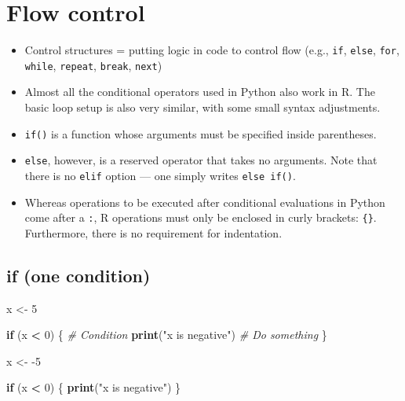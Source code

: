 \documentclass[
]{book}
\newenvironment{Shaded}{\begin{snugshade}}{\end{snugshade}}
\newcommand{\CommentTok}[1]{\textcolor[rgb]{0.56,0.35,0.01}{\textit{#1}}}
\newcommand{\ControlFlowTok}[1]{\textcolor[rgb]{0.13,0.29,0.53}{\textbf{#1}}}
\newcommand{\DecValTok}[1]{\textcolor[rgb]{0.00,0.00,0.81}{#1}}
\newcommand{\KeywordTok}[1]{\textcolor[rgb]{0.13,0.29,0.53}{\textbf{#1}}}
\newcommand{\NormalTok}[1]{#1}
\newcommand{\OperatorTok}[1]{\textcolor[rgb]{0.81,0.36,0.00}{\textbf{#1}}}
\newcommand{\StringTok}[1]{\textcolor[rgb]{0.31,0.60,0.02}{#1}}
\begin{document}
\hypertarget{flow}{%
\section{Flow control}\label{flow}}

\begin{itemize}
\item
  Control structures = putting logic in code to control flow (e.g., \texttt{if}, \texttt{else}, \texttt{for}, \texttt{while}, \texttt{repeat}, \texttt{break}, \texttt{next})
\item
  Almost all the conditional operators used in Python also work in R. The basic loop setup is also very similar, with some small syntax adjustments.
\item
  \texttt{if()} is a function whose arguments must be specified inside parentheses.
\item
  \texttt{else}, however, is a reserved operator that takes no arguments. Note that there is no \texttt{elif} option --- one simply writes \texttt{else\ if()}.
\item
  Whereas operations to be executed after conditional evaluations in Python come after a \texttt{:}, R operations must only be enclosed in curly brackets: \texttt{\{\}}. Furthermore, there is no requirement for indentation.
\end{itemize}

\hypertarget{if-one-condition}{%
\subsection{if (one condition)}\label{if-one-condition}}

\begin{Shaded}
\begin{Highlighting}[]
\NormalTok{x \textless{}{-}}\StringTok{ }\DecValTok{5}

\ControlFlowTok{if}\NormalTok{ (x }\OperatorTok{\textless{}}\StringTok{ }\DecValTok{0}\NormalTok{) \{ }\CommentTok{\# Condition }
  \KeywordTok{print}\NormalTok{(}\StringTok{"x is negative"}\NormalTok{) }\CommentTok{\# Do something }
\NormalTok{\}}
\end{Highlighting}
\end{Shaded}

\begin{Shaded}
\begin{Highlighting}[]
\NormalTok{x \textless{}{-}}\StringTok{ }\DecValTok{{-}5}

\ControlFlowTok{if}\NormalTok{ (x }\OperatorTok{\textless{}}\StringTok{ }\DecValTok{0}\NormalTok{) \{}
  \KeywordTok{print}\NormalTok{(}\StringTok{"x is negative"}\NormalTok{)}
\NormalTok{\}}
\end{Highlighting}
\end{Shaded}
\end{document}
